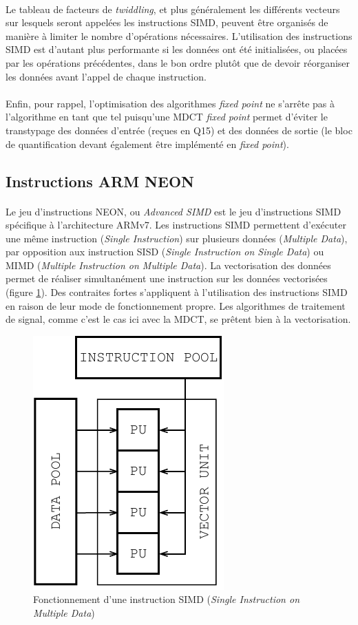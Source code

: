 \documentclass{article}
\begin{document}
    \paragraph{}
    Le tableau de facteurs de \emph{twiddling}, et plus généralement les différents vecteurs sur lesquels seront appelées les instructions SIMD, peuvent être organisés de manière à limiter le nombre d'opérations nécessaires. L'utilisation des instructions SIMD est d'autant plus performante si les données ont été initialisées, ou placées par les opérations précédentes, dans le bon ordre plutôt que de devoir réorganiser les données avant l'appel de chaque instruction.

    \paragraph{}
    Enfin, pour rappel, l'optimisation des algorithmes \emph{fixed point} ne s'arrête pas à l'algorithme en tant que tel puisqu'une MDCT \emph{fixed point} permet d'éviter le transtypage des données d'entrée (reçues en Q15) et des données de sortie (le bloc de quantification devant également être implémenté en \emph{fixed point}).


    \subsection{Instructions ARM NEON}
    \paragraph{}
    Le jeu d'instructions NEON, ou \emph{Advanced SIMD} est le jeu d'instructions SIMD spécifique à l'architecture ARMv7. Les instructions SIMD permettent d'exécuter une même instruction (\emph{Single Instruction}) sur plusieurs données (\emph{Multiple Data}), par opposition aux instruction SISD (\emph{Single Instruction on Single Data}) ou MIMD (\emph{Multiple Instruction on Multiple Data}). La vectorisation des données permet de réaliser simultanément une instruction sur les données vectorisées (figure \ref{fig:simd})\cite{wiki:SIMD}. Des contraites fortes s'appliquent à l'utilisation des instructions SIMD en raison de leur mode de fonctionnement propre. Les algorithmes de traitement de signal, comme c'est le cas ici avec la MDCT, se prêtent bien à la vectorisation.

    \begin{figure}[H]
        \centering
        \includegraphics[width=.22\linewidth]{./images/SIMD.pdf}
        \caption{Fonctionnement d'une instruction SIMD (\emph{Single Instruction on Multiple Data})}
        \label{fig:simd}
    \end{figure}
    
\end{document}
